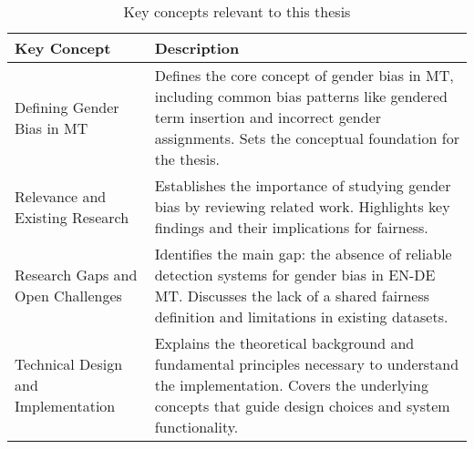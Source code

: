         \vspace{0.8em}
        \renewcommand{\arraystretch}{1.3}
            \begin{table}[ht]
            \centering
            \begin{tabularx}{\textwidth}{>{\raggedright\arraybackslash}p{6.5cm}X}
            \toprule
            \textbf{Key Concept} & \textbf{Description} \\
            \midrule

            Defining Gender Bias in MT & Defines the core concept of gender bias in MT, including common bias patterns like gendered term insertion and incorrect gender assignments. Sets the conceptual foundation for the thesis. \\

            Relevance and Existing Research & Establishes the importance of studying gender bias by reviewing related work. Highlights key findings and their implications for fairness. \\

            Research Gaps and Open Challenges & Identifies the main gap: the absence of reliable detection systems for gender bias in EN-DE MT. Discusses the lack of a shared fairness definition and limitations in existing datasets. \\

            Technical Design and Implementation & Explains the theoretical background and fundamental principles necessary to understand the implementation. Covers the underlying concepts that guide design choices and system functionality. \\

            \bottomrule
            \end{tabularx}
            \caption{Key concepts relevant to this thesis}
            \label{tab:key-concepts}
        \end{table}
        
